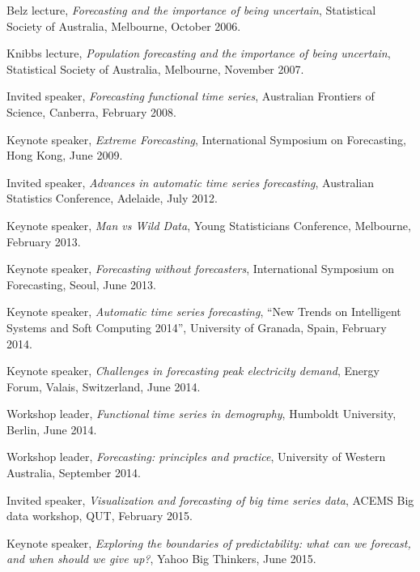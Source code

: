 \documentclass[a4paper,10pt]{article}
\begin{document}
\begin{compactitem}\itemsep=0.1cm
\item Belz lecture, \emph{Forecasting and the importance of being uncertain}, Statistical Society of Australia, Melbourne, October 2006.
\item Knibbs lecture, \emph{Population forecasting and the importance of being uncertain}, Statistical Society of Australia, Melbourne, November 2007.
\item Invited speaker, \emph{Forecasting functional time series}, Australian Frontiers of Science, Canberra, February 2008.
\item Keynote speaker, \emph{Extreme Forecasting}, International Symposium on Forecasting, Hong Kong, June 2009.
\item Invited speaker, \emph{Advances in automatic time series forecasting}, Australian Statistics Conference, Adelaide, July 2012.
\item Keynote speaker, \emph{Man vs Wild Data}, Young Statisticians Conference, Melbourne, February 2013.
\item Keynote speaker, \emph{Forecasting without forecasters}, {International Symposium on Forecasting}, Seoul, June 2013.
\item Keynote speaker, \emph{Automatic time series forecasting},  ``New Trends on Intelligent Systems and Soft Computing 2014'', University of Granada, Spain, February 2014.
\item Keynote speaker, \emph{Challenges in forecasting peak electricity demand}, Energy Forum, Valais, Switzerland, June 2014.
\item Workshop leader, \emph{Functional time series in demography}, Humboldt University, Berlin, June 2014.
\item Workshop leader, \emph{Forecasting: principles and practice}, University of Western Australia, September 2014.
\item Invited speaker, \emph{Visualization and forecasting of big time series data},   ACEMS Big data workshop, QUT, February 2015.
\item Keynote speaker,  \emph{Exploring the boundaries of predictability: what can we forecast, and when should we give up?}, Yahoo Big Thinkers, June 2015.

\end{compactitem}
\end{document}
